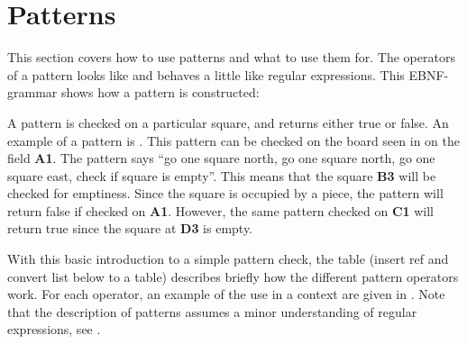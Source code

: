 \section{Patterns}
\label{sec:patterns}

This section covers how to use patterns and what to use them for. The operators
of a pattern looks like and behaves a little like regular expressions. This
EBNF-grammar shows how a pattern is constructed:

\begin{ebnf}
\end{ebnf}


A pattern is checked on a particular square, and returns either true or false.
An example of a pattern is . This pattern can be checked on
the board seen in  on the field \textbf{A1}. The pattern
says ``go one square north, go one square north, go one square east, check if
square is empty''. This means that the square \textbf{B3} will be checked for
emptiness. Since the square is occupied by a piece, the pattern will return
false if checked on \textbf{A1}. However, the same pattern checked on
\textbf{C1} will return true since the square at \textbf{D3} is empty.


With this basic introduction to a simple pattern check, the table (insert ref
and convert list below to a table) describes briefly how the different pattern
operators work. For each operator, an example of the use in a context are given
in . Note that the description of patterns assumes a
minor understanding of regular expressions, see \cite{regex}.

